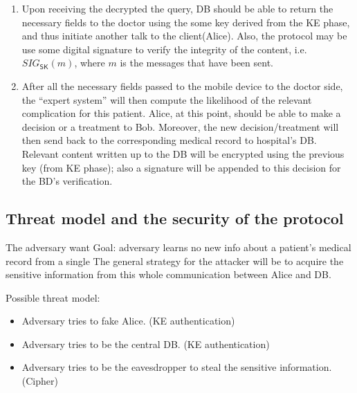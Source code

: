 \documentclass[11pt]{article}
\newcommand{\class}[1]{{\ensuremath{\mathsf{#1}}}}
\newcommand{\id}{\class{id}}
\newcommand{\xnote}[1]{}
\newcommand{\xnote}[1]{\marginpar{\textcolor{red}{\textbf{!!!}}}\textcolor{blue}{\sf #1 --X.M.}}
\begin{document}
\begin{enumerate}

\item Upon receiving the decrypted the query, DB should be able to return the necessary fields to the doctor using the some key derived from the KE phase, and thus initiate another talk to the client(Alice). Also, the protocol may be use some digital signature to verify the integrity of the content, i.e. $SIG_{\class{SK}}(m)$, where $m$ is the messages that have been sent.

\item After all the necessary fields passed to the mobile device to the doctor side, the ``expert system'' will then compute the likelihood of the relevant complication for this patient. Alice, at this point, should be able to make a decision or a treatment to Bob. Moreover, the new decision/treatment will then send back to the corresponding medical record to hospital's DB. Relevant content written up to the DB will be encrypted using the previous key (from KE phase); also a signature will be appended to this decision for the BD's verification. 
\end{enumerate}

\subsection{Threat model and the security of the protocol}
The adversary want 
Goal: adversary learns no new info about a patient's medical record from a single 
The general strategy for the attacker will be to acquire the sensitive information from this whole communication between Alice and DB.

Possible threat model:
\begin{itemize}
\item Adversary tries to fake Alice. (KE authentication)
\item Adversary tries to be the central DB. (KE authentication)
\item Adversary tries to be the eavesdropper to steal the sensitive information. (Cipher)
\end{itemize}
\end{document}
